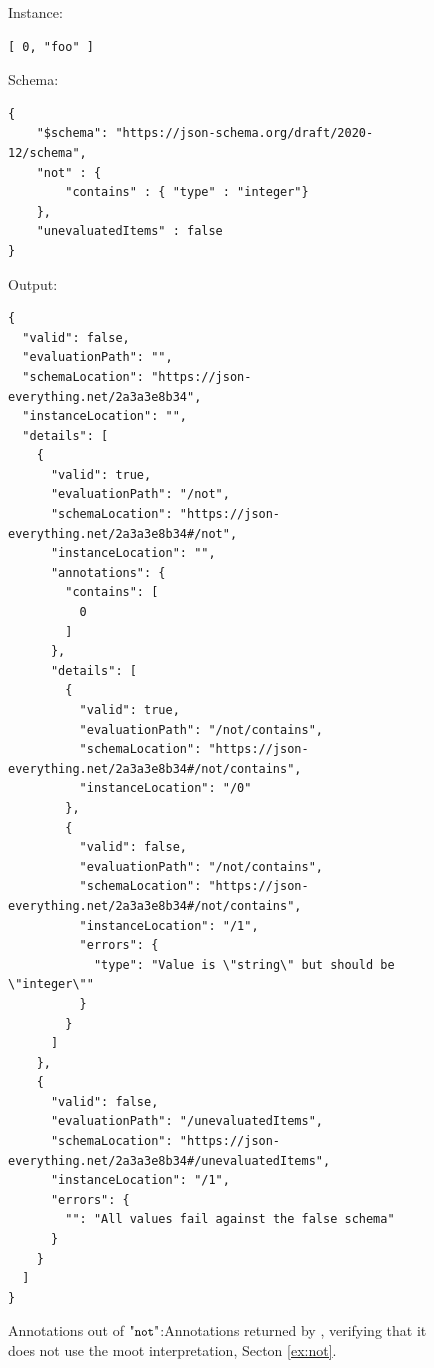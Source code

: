 \begin{figure}
\small

Instance:
\begin{querybox}{}
\begin{lstlisting}[style=querynonumbers]
[ 0, "foo" ]
\end{lstlisting}
\end{querybox}


Schema:
\begin{querybox}{}
\begin{lstlisting}[style=query]
{
	"$schema": "https://json-schema.org/draft/2020-12/schema",
	"not" : {
	    "contains" : { "type" : "integer"}
	},
	"unevaluatedItems" : false
}
\end{lstlisting}
\end{querybox}
 
Output:
\begin{querybox}{}
\begin{lstlisting}[style=query]
{
  "valid": false,
  "evaluationPath": "",
  "schemaLocation": "https://json-everything.net/2a3a3e8b34",
  "instanceLocation": "",
  "details": [
    {
      "valid": true,
      "evaluationPath": "/not",
      "schemaLocation": "https://json-everything.net/2a3a3e8b34#/not",
      "instanceLocation": "",
      "annotations": {
        "contains": [
          0
        ]
      },
      "details": [
        {
          "valid": true,
          "evaluationPath": "/not/contains",
          "schemaLocation": "https://json-everything.net/2a3a3e8b34#/not/contains",
          "instanceLocation": "/0"
        },
        {
          "valid": false,
          "evaluationPath": "/not/contains",
          "schemaLocation": "https://json-everything.net/2a3a3e8b34#/not/contains",
          "instanceLocation": "/1",
          "errors": {
            "type": "Value is \"string\" but should be \"integer\""
          }
        }
      ]
    },
    {
      "valid": false,
      "evaluationPath": "/unevaluatedItems",
      "schemaLocation": "https://json-everything.net/2a3a3e8b34#/unevaluatedItems",
      "instanceLocation": "/1",
      "errors": {
        "": "All values fail against the false schema"
      }
    }
  ]
}
\end{lstlisting}
\end{querybox}

\caption{Annotations out of $\qnot$:Annotations returned by {\JE}, verifying that it does not use the 
moot interpretation, Secton \ref{ex:not}.}
\label{fig:notje}
\end{figure}



